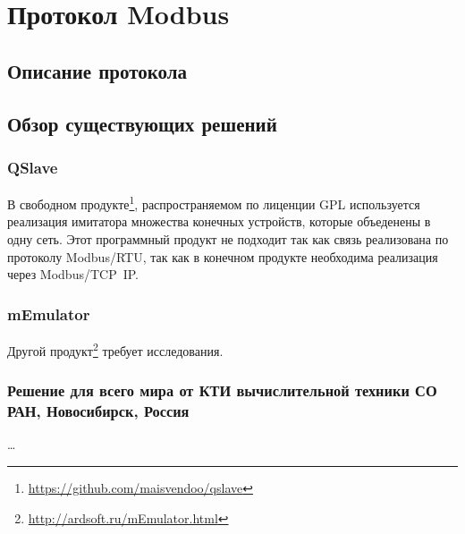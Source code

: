 
\chapter{Протокол Modbus}\label{ch:ch2}



\section{Описание протокола}

\section{Обзор существующих решений}\label{sec:ch2/sec1}


\subsection{QSlave}

В свободном продукте\footnote{\url{https://github.com/maisvendoo/qslave}}, распространяемом по лиценции GPL используется
реализация имитатора множества конечных устройств, которые объеденены в одну сеть.
Этот программный продукт не подходит так как связь реализована по протоколу
Modbus/RTU, так как в конечном продукте необходима реализация через Modbus/TCP~IP.

\subsection{mEmulator}
Другой продукт\footnote{\url{http://ardsoft.ru/mEmulator.html}} требует исследования.


\subsection{Решение для всего мира от КТИ вычислительной техники СО РАН, Новосибирск, Россия}

\cite{journal:vechisl_tech:2004_okolnischnikov} \ldots


